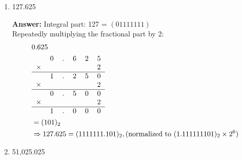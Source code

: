 \documentclass[12pt]{article}
\begin{document}
\begin{enumerate}
\begin{enumerate}
      \item 127.625

      \textbf{Answer:}
      Integral part: 127 = $(0111 1111)$ \\
      Repeatedly multiplying the fractional part by 2:
      \begin{align*}
        & 0.625 \\
        &\begin{tabular}{cccccc}
          & 0 & . & 6 & 2 & 5 \\
        $\times$ & & & & & 2 \\
        \hline
          & 1 & . & 2 & 5 & 0 \\
        $\times$ & & & & & 2 \\
        \hline
          & 0 & . & 5 & 0 & 0 \\
        $\times$ & & & & & 2 \\
        \hline
          & 1 & . & 0 & 0 & 0 \\
        \end{tabular} \\
        &= (101)_2 \\
        &\Rightarrow 127.625 = (1111111.101)_2, \text{(normalized to} \ (1.111111101)_2 \times 2^{6})
      \end{align*}

      \item 51,025.025


\end{enumerate}
\end{enumerate}
\end{document}
